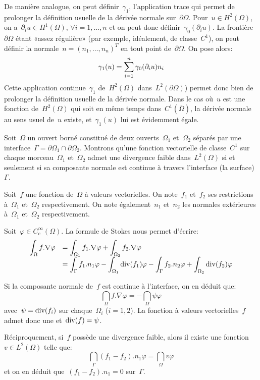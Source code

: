 \medskip
De manière analogue, on peut définir~$\gamma_1$, l'application trace qui permet de prolonger la définition usuelle de la dérivée normale sur~$\partial\Omega$.
Pour~$u\in H^2(\Omega)$, on a~$\partial_iu\in H^1(\Omega)$, $\forall i=1,\ldots,n$ et on peut donc définir~$\gamma_0(\partial_iu)$. La frontière~$\partial\Omega$ étant «assez régulière» (par exemple, idéalement, de classe~$C^1$), on peut définir la normale~$n = (n_1,\ldots,n_n)^T$ en tout point de~$\partial\Omega$.
On pose alors:
\begin{equation}\gamma_1(u) = \displaystyle\sum_{i=1}^n \gamma_0(\partial_iu)n_i\end{equation}
Cette application continue~$\gamma_1$ de~$H^2(\Omega)$ dans~$L^2(\partial\Omega)$) permet donc bien de prolonger la définition usuelle de la dérivée normale.
Dans le cas où~$u$ est une fonction de~$H^2(\Omega)$ qui soit en même temps dans~$C^1(\overline{\Omega})$, la dérivée normale au sens usuel de~$u$ existe, et~$\gamma_1(u)$ lui est évidemment égale.

\begin{remarque}
Soit~$\Omega$ un ouvert borné constitué de deux ouverts~$\Omega_1$ et~$\Omega_2$ séparés par une interface~$\Gamma=\partial\Omega_1\cap\partial\Omega_2$. Montrons qu'une fonction vectorielle de classe~$C^1$ sur chaque morceau~$\Omega_1$ et~$\Omega_2$ admet une divergence faible dans~$L^2(\Omega)$ si et seulement si sa composante normale est continue à travers l'interface (la surface)~$\Gamma$.

\medskip
Soit~$f$ une fonction de~$\Omega$ à valeurs vectorielles. On note~$f_1$ et~$f_2$ ses restrictions à~$\Omega_1$ et~$\Omega_2$ respectivement. On note également~$n_1$ et~$n_2$ les normales extérieures à~$\Omega_1$ et~$\Omega_2$ respectivement.

Soit~$\varphi\in C_c^\infty(\Omega)$. La formule de Stokes nous permet d'écrire:
\[
\begin{array}{ll}
\displaystyle\int_\Omega f.\nabla\varphi & =\displaystyle\int_{\Omega_1} f_1.\nabla\varphi +\displaystyle\int_{\Omega_2} f_2.\nabla\varphi \\
& = \displaystyle\int_\Gamma f_1.n_1\varphi - \displaystyle\int_{\Omega_1} \operatorname{div}(f_1)\varphi
- \displaystyle\int_\Gamma f_2.n_2\varphi + \displaystyle\int_{\Omega_2} \operatorname{div}(f_2)\varphi
\end{array}
\]

Si la composante normale de~$f$ est continue à l'interface, on en déduit que:
\[ \dint_\Omega f.\nabla\varphi = -\dint_\Omega \psi\varphi \]
avec~$\psi=\operatorname{div}(f_i)$ sur chaque~$\Omega_i$ ($i=1,2$).
La fonction à valeurs vectorielles~$f$ admet donc une  et~$\operatorname{div}(f)=\psi$.

Réciproquement, si~$f$ possède une divergence faible, alors il existe une fonction~$v\in L^2(\Omega)$ telle que:
\[ \dint_\Gamma (f_1-f_2).n_1\varphi = \dint_\Omega v\varphi \]
et on en déduit que~$(f_1-f_2).n_1=0$ sur~$\Gamma$.
\end{remarque}

